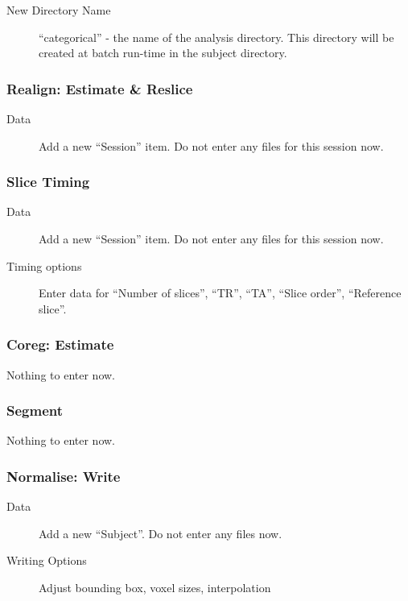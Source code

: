 \begin{description}
\item[New Directory Name] ``categorical'' - the name of the analysis
  directory. This directory will be created at batch run-time in the subject
  directory. 
\end{description}

\subsubsection*{Realign: Estimate \& Reslice}

\begin{description}
\item[Data] Add a new ``Session'' item. Do not enter any files for this
  session now.
\end{description}

\subsubsection*{Slice Timing}

\begin{description}
\item[Data] Add a new ``Session'' item. Do not enter any files for this
  session now.
\item[Timing options] Enter data for ``Number of slices'', ``TR'', ``TA'',
  ``Slice order'', ``Reference slice''.
\end{description}

\subsubsection*{Coreg: Estimate} 

Nothing to enter now.

\subsubsection*{Segment}

 Nothing to enter now.

\subsubsection*{Normalise: Write}

\begin{description}
\item[Data] Add a new ``Subject''. Do not enter any files now.
\item[Writing Options] Adjust bounding box, voxel sizes, interpolation
\end{description}

